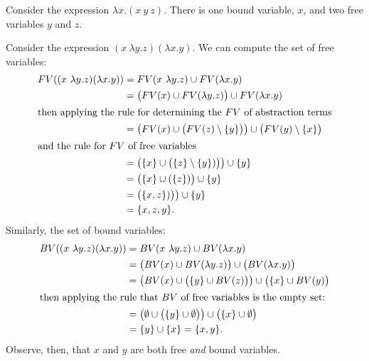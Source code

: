 \begin{node}[Syntax]
\begin{node}
\begin{node}[Example]\label{untyped-lambda-000A}%
Consider the expression $\lambda x.(x~y~z)$. There is one bound
variable, $x$, and two free variables $y$ and $z$.
\end{node}

\begin{node}[Example]\label{untyped-lambda-000B}%
Consider the expression $(x~\lambda y.z)(\lambda x.y)$. We can compute
the set of free variables:
\begin{subequations}
\begin{align}
FV((x~\lambda y.z)(\lambda x.y))
&=FV(x~\lambda y.z)\cup FV(\lambda x.y)\\
&=\bigl(FV(x)\cup FV(\lambda y.z)\bigr)\cup FV(\lambda x.y)\\
\intertext{then applying the rule for determining the $FV$ of abstraction terms}
&=\bigl(FV(x)\cup\bigl(FV(z)\setminus\{y\}\bigr)\bigr)\cup\bigl(FV(y)\setminus\{x\}\bigr)\\
\intertext{and the rule for $FV$ of free variables}
&=\bigl(\{x\}\cup\bigl(\{z\}\setminus\{y\})\bigr)\bigr)\cup\{y\}\\
&=\bigl(\{x\}\cup(\{z\})\bigr)\cup\{y\}\\
&=\bigl(\{x, z\})\bigr)\bigr)\cup\{y\}\\
&=\{x, z, y\}.
\end{align}
\end{subequations}
Similarly, the set of bound variables:
\begin{subequations}
\begin{align}
BV((x~\lambda y.z)(\lambda x.y))
&=BV(x~\lambda y.z)\cup BV(\lambda x.y)\\
&=\bigl(BV(x)\cup BV(\lambda y.z)\bigr)\cup\bigl(BV(\lambda x.y)\bigr)\\
&=\bigl(BV(x)\cup\bigl(\{y\}\cup BV(z)\bigr)\bigr)\cup\bigl(\{x\}\cup BV(y)\bigr)\\
\intertext{then applying the rule that $BV$ of free variables is the
  empty set:}
&=\bigl(\emptyset\cup\bigl(\{y\}\cup\emptyset\bigr)\bigr)\cup\bigl(\{x\}\cup\emptyset\bigr)\\
&=\{y\}\cup\{x\}=\{x,y\}.
\end{align}
\end{subequations}
Observe, then, that $x$ and $y$ are both free \emph{and} bound variables.
\end{node}
\end{node}


\end{node}
